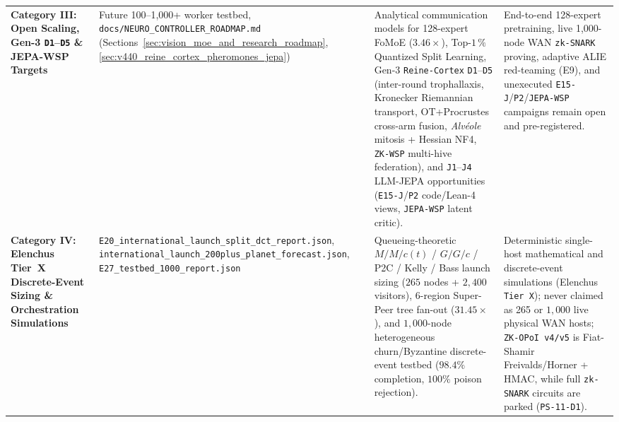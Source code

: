 \documentclass[11pt,a4paper]{article}
\begin{document}
\begin{table}[htbp!]
{\begin{tabular}{@{}>{\raggedright\arraybackslash}p{2.9cm}>{\raggedright\arraybackslash}p{3.8cm}>{\raggedright\arraybackslash}p{5.3cm}>{\raggedright\arraybackslash}p{4.0cm}@{}}
\textbf{Category III: Open Scaling, Gen-3 \texttt{D1}--\texttt{D5} \& JEPA-WSP Targets} & Future 100--1{,}000+ worker testbed, \texttt{docs/NEURO\_\allowbreak CONTROLLER\_\allowbreak ROADMAP.md} (Sections~\ref{sec:vision_moe_and_research_roadmap}, \ref{sec:v440_reine_cortex_pheromones_jepa}) & Analytical communication models for 128-expert FoMoE ($3.46\times$), Top-$1\,\%$ Quantized Split Learning, Gen-3 \texttt{Reine-Cortex} \texttt{D1}--\texttt{D5} (inter-round trophallaxis, Kronecker Riemannian transport, OT+Procrustes cross-arm fusion, \emph{Alv\'eole} mitosis + Hessian NF4, \texttt{ZK-WSP} multi-hive federation), and \texttt{J1}--\texttt{J4} LLM-JEPA opportunities (\texttt{E15-J}/\texttt{P2} code/Lean-4 views, \texttt{JEPA-WSP} latent critic). & End-to-end 128-expert pretraining, live 1{,}000-node WAN \texttt{zk-SNARK} proving, adaptive ALIE red-teaming (E9), and unexecuted \texttt{E15-J}/\texttt{P2}/\texttt{JEPA-WSP} campaigns remain open and pre-registered. \\
\textbf{Category IV: Elenchus Tier~X Discrete-Event Sizing \& Orchestration Simulations} & \texttt{E20\_international\_\allowbreak launch\_split\_dct\_\allowbreak report.json}, \texttt{international\_launch\_\allowbreak 200plus\_planet\_\allowbreak forecast.json}, \texttt{E27\_testbed\_1000\_\allowbreak report.json} & Queueing-theoretic $M/M/c(t)$ / $G/G/c$ / P2C / Kelly / Bass launch sizing ($265$ nodes + $2{,}400$ visitors), 6-region Super-Peer tree fan-out ($31.45\times$), and $1{,}000$-node heterogeneous churn/Byzantine discrete-event testbed ($98.4\%$ completion, $100\%$ poison rejection). & Deterministic single-host mathematical and discrete-event simulations (Elenchus \texttt{Tier~X}); never claimed as 265 or $1{,}000$ live physical WAN hosts; \texttt{ZK-OPoI v4/v5} is Fiat-Shamir Freivalds/Horner + HMAC, while full \texttt{zk-SNARK} circuits are parked (\texttt{PS-11-D1}). \\
\bottomrule
\end{tabular}%
}
\end{table}
\end{document}
